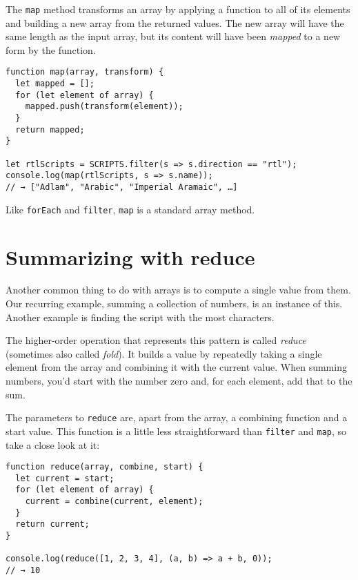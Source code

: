 The \lstinline`map` method transforms an array by applying a function to all of its elements and building a new array from the returned values. The new array will have the same length as the input array, but its content will have been \emph{mapped} to a new form by the function.

\begin{lstlisting}
function map(array, transform) {
  let mapped = [];
  for (let element of array) {
    mapped.push(transform(element));
  }
  return mapped;
}

let rtlScripts = SCRIPTS.filter(s => s.direction == "rtl");
console.log(map(rtlScripts, s => s.name));
// → ["Adlam", "Arabic", "Imperial Aramaic", …]
\end{lstlisting}
\noindent

Like \lstinline`forEach` and \lstinline`filter`, \lstinline`map` is a standard array method.

\section{Summarizing with reduce}

Another common thing to do with arrays is to compute a single value from them. Our recurring example, summing a collection of numbers, is an instance of this. Another example is finding the script with the most characters.

The higher-order operation that represents this pattern is called \emph{reduce} (sometimes also called \emph{fold}). It builds a value by repeatedly taking a single element from the array and combining it with the current value. When summing numbers, you'd start with the number zero and, for each element, add that to the sum.

The parameters to \lstinline`reduce` are, apart from the array, a combining function and a start value. This function is a little less straightforward than \lstinline`filter` and \lstinline`map`, so take a close look at it:

\begin{lstlisting}
function reduce(array, combine, start) {
  let current = start;
  for (let element of array) {
    current = combine(current, element);
  }
  return current;
}

console.log(reduce([1, 2, 3, 4], (a, b) => a + b, 0));
// → 10
\end{lstlisting}
\noindent{}

